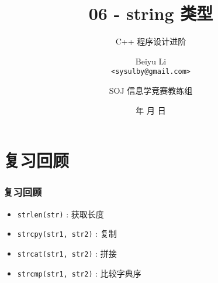 \title[06 - string 类型]
{06 - string 类型}

\subtitle{C++ 程序设计进阶}

\author[Beiyu Li]
{Beiyu Li\\
\texttt{<sysulby@gmail.com>}}


\date[\today]
{\number\year 年 \number\month 月 \number\day 日}




\author[sysulby]
{SOJ 信息学竞赛教练组}

\begin{frame}
    \titlepage
\end{frame}
\setcounter{framenumber}{0} %


\section{复习回顾}

\begin{frame}[fragile]
    \frametitle{复习回顾}


     {
        \begin{itemize}
            \item \lstinline|strlen(str)| : 获取长度
            \item \lstinline|strcpy(str1, str2)| : 复制
            \item \lstinline|strcat(str1, str2)| : 拼接
            \item \lstinline|strcmp(str1, str2)| : 比较字典序
        \end{itemize}
    }
    
\end{frame}

